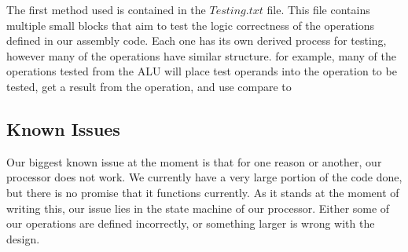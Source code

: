 \documentclass[journal]{IEEEtran}
\begin{document}
	The first method used is contained in the $Testing.txt$ file. This file contains multiple small blocks that aim to test the logic correctness of the operations defined in our assembly code. Each one has its own derived process for testing, however many of the operations have similar structure. for example, many of the operations tested from the ALU will place test operands into the operation to be tested, get a result from the operation, and use compare to 

\subsection{Known Issues}
	Our biggest known issue at the moment is that for one reason or another, our processor does not work. We currently have a very large portion of the code done, but there is no promise that it functions currently. As it stands at the moment of writing this, our issue lies in the state machine of our processor. Either some of our operations are defined incorrectly, or something larger is wrong with the design. 
\end{document}
